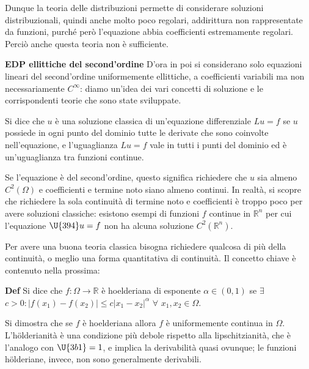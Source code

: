 \documentclass{article}
\begin{document}
Dunque la teoria delle distribuzioni permette di considerare soluzioni
distribuzionali, quindi anche molto poco regolari, addirittura non
rappresentate da funzioni, purch\'{e} per\`{o} l'equazione abbia
coefficienti estremamente regolari. Perci\`{o} anche questa teoria non \`{e}
sufficiente.

\textbf{EDP ellittiche del second'ordine} D'ora in poi si considerano solo
equazioni lineari del second'ordine uniformemente ellittiche, a coefficienti
variabili ma non necessariamente $C^{\infty }$: diamo un'idea dei vari
concetti di soluzione e le corrispondenti teorie che sono state sviluppate.

Si dice che $u$ \`{e} una soluzione classica di un'equazione differenziale $%
Lu=f$ se $u$ possiede in ogni punto del dominio tutte le derivate che sono
coinvolte nell'equazione, e l'uguaglianza $Lu=f$ vale in tutti i punti del
dominio ed \`{e} un'uguaglianza tra funzioni continue.

Se l'equazione \`{e} del second'ordine, questo significa richiedere che $u$
sia almeno $C^{2}(%
\Omega
)$ e coefficienti e termine noto siano almeno continui. In realt\`{a}, si
scopre che richiedere la sola continuit\`{a} di termine noto e coefficienti 
\`{e} troppo poco per avere soluzioni classiche: esistono esempi di funzioni 
$f$ continue in $%
\mathbb{R}
^{n}$ per cui l'equazione $\U{394} u=f$ non ha alcuna soluzione $C^{2}(%
\mathbb{R}
^{n})$.

Per avere una buona teoria classica bisogna richiedere qualcosa di pi\`{u}
della continuit\`{a}, o meglio una forma quantitativa di continuit\`{a}. Il
concetto chiave \`{e} contenuto nella prossima:

\textbf{Def} Si dice che $f:\Omega \rightarrow 
\mathbb{R}
$ \`{e} hoelderiana di esponente $\alpha \in \left( 0,1\right) $ se $\exists 
$ $c>0:\left\vert f\left( x_{1}\right) -f\left( x_{2}\right) \right\vert
\leq c\left\vert x_{1}-x_{2}\right\vert ^{\alpha }$ $\forall $ $%
x_{1},x_{2}\in \Omega $.

Si dimostra che se $f$ \`{e} hoelderiana allora $f$ \`{e} uniformemente
continua in $%
\Omega
$. L'h\"{o}lderianit\`{a} \`{e} una condizione pi\`{u} debole rispetto alla
lipschitzianit\`{a}, che \`{e} l'analogo con $\U{3b1} =1$, e implica la
derivabilit\`{a} quasi ovunque; le funzioni h\"{o}lderiane, invece, non sono
generalmente derivabili.
\end{document}

